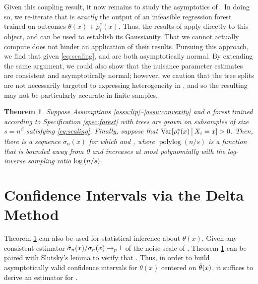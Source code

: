 \documentclass[aos]{imsart}
\theoremstyle{plain}
\newtheorem{theo}[prop]{Theorem}
\theoremstyle{definition}
\theoremstyle{remark}
\begin{document}
\begin{CJK}{UTF8}{gbsn}
{Given this coupling result, it now remains to study the asymptotics of .
In doing so, we re-iterate that  is \emph{exactly} the output of an infeasible
regression forest trained on outcomes $\theta(x) + \rho_i^*(x)$. Thus, the results of
\citet{wager2015estimation} apply directly to this object, and can be used to establish
its Gaussianity. That we cannot actually compute 
does not hinder an application of their results.
Pursuing this approach, we find that given \eqref{eq:scaling},  and
 are both asymptotically normal. By extending the same
argument, we could also show that the nuisance parameter estimates  are
consistent and asymptotically normal; however, we caution that the tree splits are not necessarily
targeted to expressing heterogeneity in , and so the resulting 
may not be particularly accurate in finite samples.

\begin{theo}
\label{theo:gauss}
Suppose Assumptions \ref{assu:lip}--\ref{assu:convexity} and
a forest trained according to Specification \ref{spec:forest} with
trees are grown on subsamples of size $s = n^\beta $ satisfying \eqref{eq:scaling}.
Finally, suppose that $\operatorname{Var}[\rho_i^*(x) \,\big|\, X_i = x] > 0$. Then, there is a sequence
$\sigma_n(x)$ for which
 and
,
where $\operatorname{polylog}(n/s)$ is a function that is bounded away from 0 and
increases at most polynomially with the log-inverse sampling ratio $\log\left(n/s\right)$.
\end{theo}



\section{Confidence Intervals via the Delta Method}
\label{sec:delta_method}

Theorem \ref{theo:gauss} can also be used for statistical inference about $\theta(x)$. Given any
consistent estimator $\hat{\sigma}_n(x)/\sigma_n(x) \rightarrow_p 1$ of the noise scale
of , Theorem \ref{theo:gauss} can be paired with Slutsky's lemma
to verify that
.
Thus, in order to build asymptotically valid confidence intervals for $\theta(x)$ centered on $\hat{\theta}(x)$,
it suffices to derive an estimator for .

}
\end{CJK}
\end{document}
